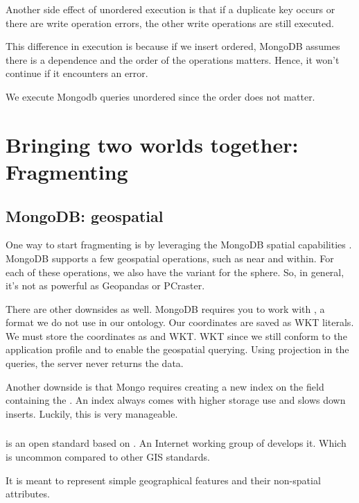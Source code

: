 Another side effect of unordered execution is that if a duplicate key occurs or there are write operation errors, the other write operations are still executed. 

This difference in execution is because if we insert ordered, MongoDB assumes there is a dependence and the order of the operations matters. Hence, it won't continue if it encounters an error.

We execute Mongodb queries unordered since the order does not matter.

\section{Bringing two worlds together: Fragmenting}\label{sec:fragimpl}
\subsection{MongoDB: geospatial}
One way to start fragmenting is by leveraging the MongoDB spatial capabilities \cite{noauthor_geospatial_nodate}. MongoDB supports a few geospatial operations, such as near and within. For each of these operations, we also have the variant for the sphere. So, in general, it's not as powerful as Geopandas or PCraster. 

There are other downsides as well. MongoDB requires you to work with , a format we do not use in our ontology. Our coordinates are saved as WKT literals. We must store the coordinates as  and WKT. WKT since we still conform to the application profile and  to enable the geospatial querying. Using projection in the queries, the server never returns the  data. 

Another downside is that Mongo requires creating a new index on the field containing the . An index always comes with higher storage use and slows down inserts. Luckily, this is very manageable.

\subsubsection{}
 \cite{butler_geojson_2016} is an open standard based on . An Internet working group of  develops it. Which is uncommon compared to other GIS standards. 

It is meant to represent simple geographical features and their non-spatial attributes. 


